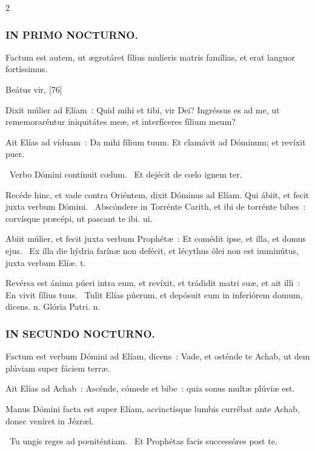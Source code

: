 \documentclass[9pt,twoside]{extarticle}
\begin{document}
\begin{multicols}{2}
{{{\subsubsection*{\center \textsc{IN PRIMO NOCTURNO.}}
\begin{tightlist}{}
\item {} Factum est autem, ut ægrotáret fílius mulíeris matris famílias, et erat languor fortíssimus.
\item {} Beátus vir,  [76]
\item {} Dixit múlier ad Elíam~: Quid mihi et tibi, vir Dei? Ingréssus es ad me, ut rememoraréntur iniquitátes meæ, et interfíceres fílium meum?
\item {} Ait Elías ad víduam~: Da mihi fílium tuum. Et clamávit ad Dóminum; et revíxit puer.
\item {}~Verbo Dómini contínuit cœlum. ~Et dejécit de cœlo ignem ter.
\item {}
\item {} Recéde hinc, et vade contra Oriéntem, dixit Dóminus ad Elíam. \textred{*} Qui ábiit, et fecit juxta verbum Dómini. ~Abscóndere in Torrénte Carith, et ibi de torrénte bibes~: corvísque præcépi, ut pascant te ibi. ui.
\item {} Abiit múlier, et fecit juxta verbum Prophétæ~: \textred{*} Et comédit ipse, et illa, et domus ejus. ~Ex illa die hýdria farínæ non defécit, et lécythus ólei non est imminútus, juxta verbum Elíæ. t.
\item {} Revérsa est ánima púeri intra eum, et revíxit, et trádidit matri suæ, et ait illi~: \textred{*} En vivit fílius tuus. ~Tulit Elías púerum, et depósuit eum in inferiórem domum, dicens. n. Glória Patri. n.
\end{tightlist}

\subsubsection*{\center \textsc{IN SECUNDO NOCTURNO.}}
\begin{tightlist}{}
\item {} Factum est verbum Dómini ad Elíam, dicens~: Vade, et osténde te Achab, ut dem plúviam super fáciem terræ.
\item {} Ait Elías ad Achab~: Ascénde, cómede et bibe~: quia sonus multæ plúviæ est.
\item {} Manus Dómini facta est super Elíam, accinctísque lumbis currébat ante Achab, donec veníret in Jézræl.
\item {}~Tu ungis reges ad pœniténtiam. ~Et Prophétas facis successóres post te.
\end{tightlist}

}}}
\end{multicols}
\end{document}

